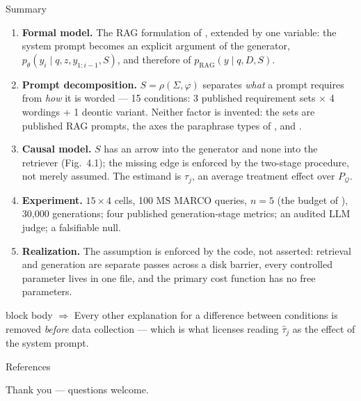 \documentclass[11pt,aspectratio=169]{beamer}
\newcommand{\takeaway}[1]{%
  \vfill
  \begin{beamercolorbox}[wd=\textwidth,sep=5pt,rounded=true]{block body}%
    \small\textbf{$\Rightarrow$} #1
  \end{beamercolorbox}}
\begin{document}
\begin{frame}[shrink=5]{Summary}
  \begin{enumerate}
    \item \textbf{Formal model.} The RAG formulation of \citet{lewis2020rag},
          extended by one variable: the system prompt becomes an explicit
          argument of the generator,
          $p_\theta(y_i \mid q,z,y_{1:i-1},S)$, and therefore of
          $p_{\mathrm{RAG}}(y \mid q,D,S)$.
    \item \textbf{Prompt decomposition.} $S = \rho(\Sigma,\varphi)$ separates
          \emph{what} a prompt requires from \emph{how} it is worded ---
          15 conditions: 3 published requirement sets $\times$ 4 wordings +
          1 deontic variant. Neither factor is invented: the sets are published
          RAG prompts, the axes the paraphrase types of
          \citet{wahle2024paraphrase}, \citet{zhan2024lexical} and
          \citet{kostic2026samemeaning}.
    \item \textbf{Causal model.} $S$ has an arrow into the generator and none
          into the retriever (Fig.~4.1); the missing edge is enforced by the
          two-stage procedure, not merely assumed. The estimand is
          $\tau_j$, an average treatment effect over $P_{\mathcal{Q}}$.
    \item \textbf{Experiment.} $15\times4$ cells, 100 MS MARCO queries,
          $n=5$ (the budget of \citealp{zhuo2024prosa}), 30{,}000
          generations; four published generation-stage metrics; an audited LLM
          judge; a falsifiable null.
    \item \textbf{Realization.} The assumption is enforced by the code, not
          asserted: retrieval and generation are separate passes across a disk
          barrier, every controlled parameter lives in one file, and the
          primary cost function has no free parameters.
  \end{enumerate}
  \takeaway{Every other explanation for a difference between conditions is
  removed \emph{before} data collection --- which is what licenses reading
  $\hat\tau_j$ as the effect of the system prompt.}
\end{frame}

\begin{frame}[allowframebreaks]{References}
  \scriptsize
  
\end{frame}

\begin{frame}[plain]
  \centering
  \vfill
  {\Large Thank you --- questions welcome.}
  \vfill
\end{frame}
\end{document}
